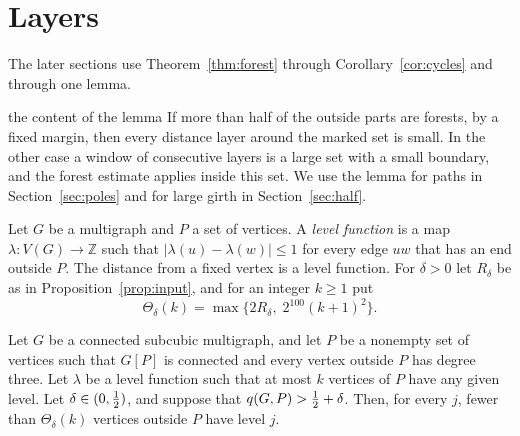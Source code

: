 \section{Layers}\label{sec:layers}

The later sections use Theorem~\ref{thm:forest} through Corollary~\ref{cor:cycles} and through
one lemma.

\begin{idea}{the content of the lemma}
If more than half of the outside parts are forests, by a fixed margin, then every distance layer
around the marked set is small. In the other case a window of consecutive layers is a large set
with a small boundary, and the forest estimate applies inside this set. We use the lemma for
paths in Section~\ref{sec:poles} and for large girth in Section~\ref{sec:half}.
\end{idea}

Let $G$ be a multigraph and $P$ a set of vertices. A \emph{level function} is a map
$\lambda\colon V(G)\to\mathbb{Z}$ such that $|\lambda(u)-\lambda(w)|\le1$ for every edge $uw$ that
has an end outside $P$. The distance from a fixed vertex is a level function. For $\delta>0$ let
$R_\delta$ be as in Proposition~\ref{prop:input}, and for an integer $k\ge1$ put
\[
  \Theta_\delta(k)=\max\bigl\{2R_\delta,\;2^{100}(k+1)^{2}\bigr\}.
\]

\begin{lemma}[Layers]\label{lem:width}
Let $G$ be a connected subcubic multigraph, and let $P$ be a nonempty set of vertices such that
$G[P]$ is connected and every vertex outside $P$ has degree three. Let $\lambda$ be a level
function such that at most $k$ vertices of $P$ have any given level. Let $\delta\in(0,\tfrac12)$, and
suppose that $q(G,P)>\tfrac12+\delta$. Then, for every $j$, fewer than $\Theta_\delta(k)$ vertices
outside $P$ have level $j$.
\end{lemma}

